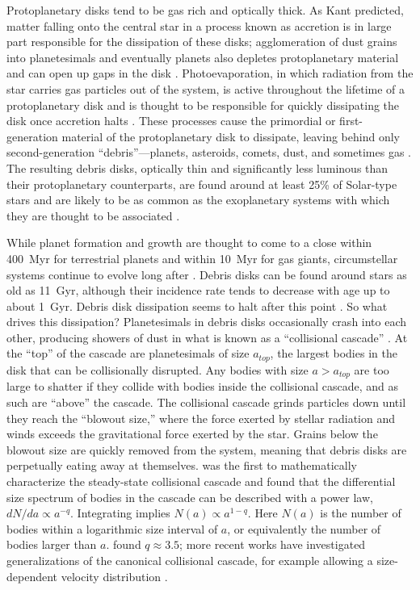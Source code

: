 \documentclass[12pt,oneside]{book}
\begin{document}
Protoplanetary disks tend to be gas rich and optically thick.
As Kant predicted, matter falling onto the central star in a process known as accretion is in large part responsible for the dissipation of these disks; agglomeration of dust grains into planetesimals and eventually planets also depletes protoplanetary material and can open up gaps in the disk \citep{williams&cieza11}.
Photoevaporation, in which radiation from the star carries gas particles out of the system, is active throughout the lifetime of a protoplanetary disk and is thought to be responsible for quickly dissipating the disk once accretion halts \citep{ercolano&pascucci17,clarke01}.
These processes cause the primordial or first-generation material of the protoplanetary disk to dissipate, leaving behind only second-generation ``debris''---planets, asteroids, comets, dust, and sometimes gas \citep{hughes18}.
The resulting debris disks, optically thin and significantly less luminous than their protoplanetary counterparts, are found around at least 25\% of Solar-type stars and are likely to be as common as the exoplanetary systems with which they are thought to be associated \citep{montesinos16}.

While planet formation and growth are thought to come to a close within \SI{400}{Myr} for terrestrial planets and within \SI{10}{Myr} for gas giants, circumstellar systems continue to evolve long after \citep{chambers13,d'angelo10}.
Debris disks can be found around stars as old as \SI{11}{Gyr}, although their incidence rate tends to decrease with age up to about \SI{1}{Gyr}. 
Debris disk dissipation seems to halt after this point \citep{sibthorpe18,matthews14}.
So what drives this dissipation?
Planetesimals in debris disks occasionally crash into each other, producing showers of dust in what is known as a ``collisional cascade'' \citep{wyatt2008}.
At the ``top'' of the cascade are planetesimals of size $a_{top}$, the largest bodies in the disk that can be collisionally disrupted.
Any bodies with size $a > a_{top}$ are too large to shatter if they collide with bodies inside the collisional cascade, and as such are ``above'' the cascade.
The collisional cascade grinds particles down until they reach the ``blowout size,'' where the force exerted by stellar radiation and winds exceeds the gravitational force exerted by the star.
Grains below the blowout size are quickly removed from the system, meaning that debris disks are perpetually eating away at themselves.
\cite{dohnanyi} was the first to mathematically characterize the steady-state collisional cascade and found that the differential size spectrum of bodies in the cascade can be described with a power law, $dN/da \propto a^{-q}$.
Integrating implies $N(a) \propto a^{1-q}$.
Here $N(a)$ is the number of bodies within a logarithmic size interval of $a$, or equivalently the number of bodies larger than $a$.
\cite{dohnanyi} found $q \approx 3.5$; more recent works have investigated generalizations of the canonical collisional cascade, for example allowing a size-dependent velocity distribution \citep{pan&schlichting12}.
\end{document}
